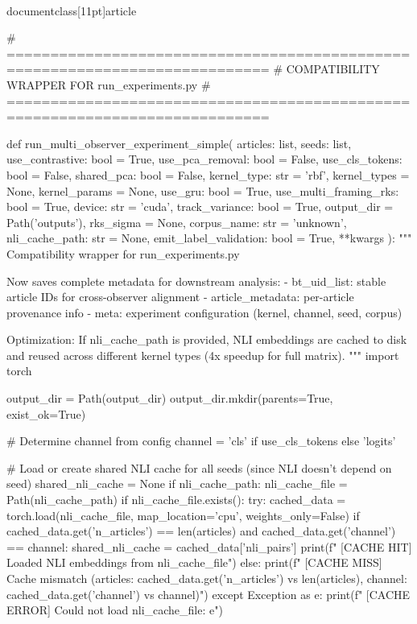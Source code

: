 \\documentclass[11pt]{article}
\begin{document}
\begin{CodeBlock}
# ============================================================================
# COMPATIBILITY WRAPPER FOR run_experiments.py
# ============================================================================

def run_multi_observer_experiment_simple(
    articles: list,
    seeds: list,
    use_contrastive: bool = True,
    use_pca_removal: bool = False,
    use_cls_tokens: bool = False,
    shared_pca: bool = False,
    kernel_type: str = 'rbf',
    kernel_types = None,
    kernel_params = None,
    use_gru: bool = True,
    use_multi_framing_rks: bool = True,
    device: str = 'cuda',
    track_variance: bool = True,
    output_dir = Path('outputs'),
    rks_sigma = None,
    corpus_name: str = 'unknown',
    nli_cache_path: str = None,
    emit_label_validation: bool = True,
    **kwargs
):
    """
    Compatibility wrapper for run_experiments.py
    
    Now saves complete metadata for downstream analysis:
    - bt_uid_list: stable article IDs for cross-observer alignment
    - article_metadata: per-article provenance info
    - meta: experiment configuration (kernel, channel, seed, corpus)
    
    Optimization: If nli_cache_path is provided, NLI embeddings are cached to disk
    and reused across different kernel types (4x speedup for full matrix).
    """
    import torch
    
    output_dir = Path(output_dir)
    output_dir.mkdir(parents=True, exist_ok=True)
    
    # Determine channel from config
    channel = 'cls' if use_cls_tokens else 'logits'
    
    # Load or create shared NLI cache for all seeds (since NLI doesn't depend on seed)
    shared_nli_cache = None
    if nli_cache_path:
        nli_cache_file = Path(nli_cache_path)
        if nli_cache_file.exists():
            try:
                cached_data = torch.load(nli_cache_file, map_location='cpu', weights_only=False)
                if cached_data.get('n_articles') == len(articles) and cached_data.get('channel') == channel:
                    shared_nli_cache = cached_data['nli_pairs']
                    print(f"  [CACHE HIT] Loaded NLI embeddings from {nli_cache_file}")
                else:
                    print(f"  [CACHE MISS] Cache mismatch (articles: {cached_data.get('n_articles')} vs {len(articles)}, channel: {cached_data.get('channel')} vs {channel})")
            except Exception as e:
                print(f"  [CACHE ERROR] Could not load {nli_cache_file}: {e}")
    

\end{CodeBlock}
\end{document}

